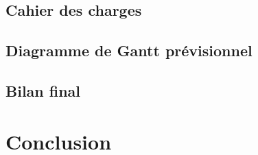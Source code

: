 \documentclass[paper=a4, fontsize=12pt]{article}
\newenvironment{changemargin}[2]{\begin{list}{}{%
      \setlength{\topsep}{0pt}%
      \setlength{\leftmargin}{0pt}%
      \setlength{\rightmargin}{0pt}%
      \setlength{\listparindent}{\parindent}%
      \setlength{\itemindent}{\parindent}%
      \setlength{\parsep}{0pt plus 1pt}%
      \addtolength{\leftmargin}{#1}%
      \addtolength{\rightmargin}{#2}%
    }\item }{\end{list}}
\numberwithin{equation}{section}		%
\numberwithin{figure}{section}			%
\numberwithin{table}{section}				%
\begin{document}
\begin{changemargin}{-1cm}{-1cm}
  \subsection{Cahier des charges}
  
  \subsection{Diagramme de Gantt prévisionnel}
  
  \subsection{Bilan final}
  
  \newpage

  \section{Conclusion}
  
  \newpage

  
  

%   
%    
%    
  

  


\end{changemargin}

\end{document}

